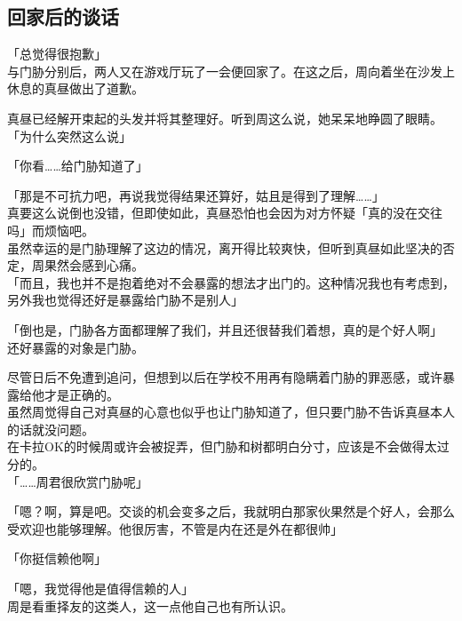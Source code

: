 \subsection{回家后的谈话}

「总觉得很抱歉」\\

与门胁分别后，两人又在游戏厅玩了一会便回家了。在这之后，周向着坐在沙发上休息的真昼做出了道歉。

真昼已经解开束起的头发并将其整理好。听到周这么说，她呆呆地睁圆了眼睛。\\

「为什么突然这么说」

「你看……给门胁知道了」

「那是不可抗力吧，再说我觉得结果还算好，姑且是得到了理解……」\\

真要这么说倒也没错，但即使如此，真昼恐怕也会因为对方怀疑「真的没在交往吗」而烦恼吧。\\

虽然幸运的是门胁理解了这边的情况，离开得比较爽快，但听到真昼如此坚决的否定，周果然会感到心痛。\\

「而且，我也并不是抱着绝对不会暴露的想法才出门的。这种情况我也有考虑到，另外我也觉得还好是暴露给门胁不是别人」

「倒也是，门胁各方面都理解了我们，并且还很替我们着想，真的是个好人啊」\\

还好暴露的对象是门胁。

尽管日后不免遭到追问，但想到以后在学校不用再有隐瞒着门胁的罪恶感，或许暴露给他才是正确的。\\

虽然周觉得自己对真昼的心意也似乎也让门胁知道了，但只要门胁不告诉真昼本人的话就没问题。\\

在卡拉OK的时候周或许会被捉弄，但门胁和树都明白分寸，应该是不会做得太过分的。\\

「……周君很欣赏门胁呢」

「嗯？啊，算是吧。交谈的机会变多之后，我就明白那家伙果然是个好人，会那么受欢迎也能够理解。他很厉害，不管是内在还是外在都很帅」

「你挺信赖他啊」

「嗯，我觉得他是值得信赖的人」\\

周是看重择友的这类人，这一点他自己也有所认识。\\

